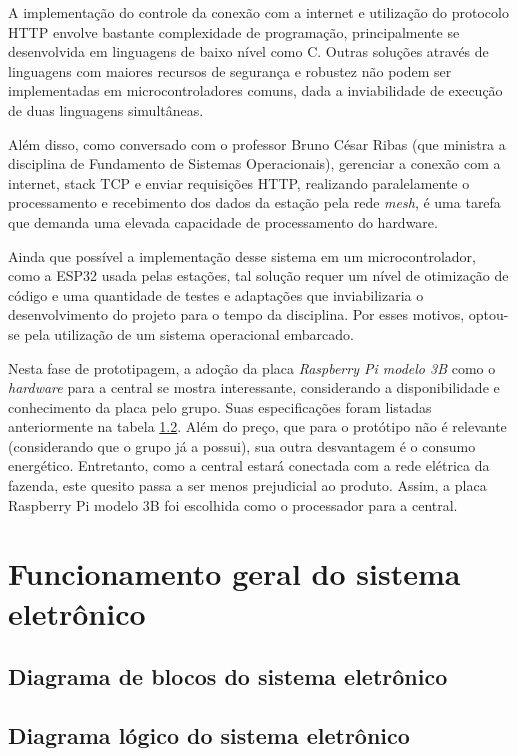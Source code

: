 A implementação do controle da conexão com a internet e utilização do protocolo HTTP envolve bastante complexidade de programação, principalmente se desenvolvida em linguagens de baixo nível como C. Outras soluções através de linguagens com maiores recursos de segurança e robustez não podem ser implementadas em microcontroladores comuns, dada a inviabilidade de execução de duas linguagens simultâneas.

Além disso, como conversado com o professor Bruno César Ribas (que ministra a disciplina de Fundamento de Sistemas Operacionais), gerenciar a conexão com a internet, stack TCP e enviar requisições HTTP, realizando paralelamente o processamento e recebimento dos dados da estação pela rede \emph{mesh}, é uma tarefa que demanda uma elevada capacidade de processamento do hardware. 

Ainda que possível a implementação desse sistema em um microcontrolador, como a ESP32 usada pelas estações, tal solução requer um nível de otimização de código e uma quantidade de testes e adaptações que inviabilizaria o desenvolvimento do projeto para o tempo da disciplina. Por esses motivos, optou-se pela utilização de um sistema operacional embarcado.

Nesta fase de prototipagem, a adoção da placa \emph{Raspberry Pi modelo 3B} como o \emph{hardware} para a central se mostra interessante, considerando a disponibilidade e conhecimento da placa pelo grupo. Suas especificações foram listadas anteriormente na tabela \ref{}. Além do preço, que para o protótipo não é relevante (considerando que o grupo já a possui), sua outra desvantagem é o consumo energético. Entretanto, como a central estará conectada com a rede elétrica da fazenda, este quesito passa a ser menos prejudicial ao produto. Assim, a placa Raspberry Pi modelo 3B foi escolhida como o processador para a central.

\section{Funcionamento geral do sistema eletrônico}

	\subsection{Diagrama de blocos do sistema eletrônico}

	\subsection{Diagrama lógico do sistema eletrônico}

